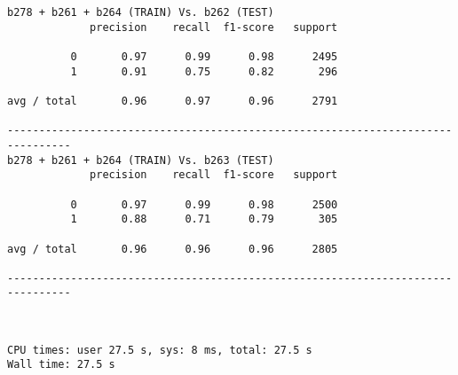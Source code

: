 \documentclass[11pt]{article}
\begin{document}
    \begin{Verbatim}[commandchars=\\\{\}]
b278 + b261 + b264 (TRAIN) Vs. b262 (TEST)
             precision    recall  f1-score   support

          0       0.97      0.99      0.98      2495
          1       0.91      0.75      0.82       296

avg / total       0.96      0.97      0.96      2791

--------------------------------------------------------------------------------
b278 + b261 + b264 (TRAIN) Vs. b263 (TEST)
             precision    recall  f1-score   support

          0       0.97      0.99      0.98      2500
          1       0.88      0.71      0.79       305

avg / total       0.96      0.96      0.96      2805

--------------------------------------------------------------------------------

    \end{Verbatim}

    \begin{center}
    \end{center}
    { \hspace*{\fill} \\}
    
    \begin{Verbatim}[commandchars=\\\{\}]
CPU times: user 27.5 s, sys: 8 ms, total: 27.5 s
Wall time: 27.5 s

    \end{Verbatim}


    
    
    
    
\end{document}
